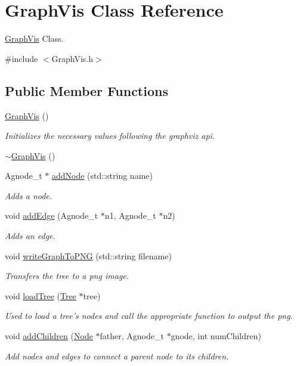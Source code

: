 \hypertarget{class_graph_vis}{\section{Graph\-Vis Class Reference}
\label{class_graph_vis}
}


\hyperlink{class_graph_vis}{Graph\-Vis} Class.  




{\ttfamily \#include $<$Graph\-Vis.\-h$>$}

\subsection*{Public Member Functions}
\begin{DoxyCompactItemize}
\item 
\hyperlink{class_graph_vis_a1497d459b62a4a82a8f965870b13ea6d}{Graph\-Vis} ()
\begin{DoxyCompactList}\small\item\em Initializes the necessary values following the graphviz api. \end{DoxyCompactList}\item 
\hyperlink{class_graph_vis_a961003c9f999090d89db19772311ba81}{$\sim$\-Graph\-Vis} ()
\item 
Agnode\-\_\-t $\ast$ \hyperlink{class_graph_vis_aaadf4feb214a03fa6f923a30b7fcbf7f}{add\-Node} (std\-::string name)
\begin{DoxyCompactList}\small\item\em Adds a node. \end{DoxyCompactList}\item 
void \hyperlink{class_graph_vis_aa6403b7de690930c61d2c2ce50268bb1}{add\-Edge} (Agnode\-\_\-t $\ast$n1, Agnode\-\_\-t $\ast$n2)
\begin{DoxyCompactList}\small\item\em Adds an edge. \end{DoxyCompactList}\item 
void \hyperlink{class_graph_vis_a5606406187d65d9fb827ffe6df14b84e}{write\-Graph\-To\-P\-N\-G} (std\-::string filename)
\begin{DoxyCompactList}\small\item\em Transfers the tree to a png image. \end{DoxyCompactList}\item 
void \hyperlink{class_graph_vis_acab8c60a8f8b1a8fecd7297d303a2601}{load\-Tree} (\hyperlink{class_tree}{Tree} $\ast$tree)
\begin{DoxyCompactList}\small\item\em Used to load a tree's nodes and call the appropriate function to output the png. \end{DoxyCompactList}\item 
void \hyperlink{class_graph_vis_a683b40ddb0fdd31e0c39af23b9826aca}{add\-Children} (\hyperlink{class_node}{Node} $\ast$father, Agnode\-\_\-t $\ast$gnode, int num\-Children)
\begin{DoxyCompactList}\small\item\em Add nodes and edges to connect a parent node to its children. \end{DoxyCompactList}\end{DoxyCompactItemize}
